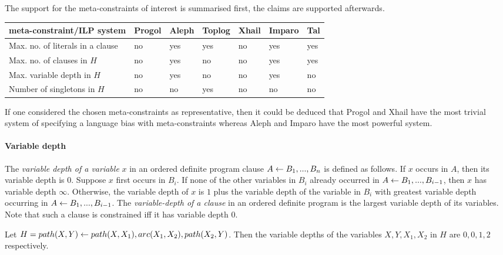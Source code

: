 The support for the meta-constraints of interest is summarised first, the claims are supported afterwards.

\begin{center}
 \label{tab:classification_by_meta-constraints} 
 \begin{tabular}{| l | l | l | l | l | l | l |}
    \hline
    meta-constraint/ILP system & Progol & Aleph & Toplog & Xhail & Imparo & Tal \\ \hline
    Max. no. of literals in a clause & no & yes & yes & no & yes & yes\\ \hline
    Max. no. of clauses in $H$ & no & yes & no & no & yes & yes\\ \hline
    Max. variable depth in $H$ & no & yes & no & no & yes & no\\ \hline
    Number of singletons in $H$ & no & no & yes & no & no & no\\ \hline
  \end{tabular}
  \end{center}
  
If one considered the chosen meta-constraints as representative, then it could be deduced that Progol and Xhail have the most trivial system of specifying a language bias with meta-constraints whereas Aleph and Imparo have the most powerful system.

\paragraph{Variable depth}
\begin{defn}\label{definition_variable_depth}\cite{nienhuys1997foundations}
The \emph{variable depth of a variable} $x$ in an ordered definite program clause
$A \leftarrow  B_1, . . . , B_n$ is defined as follows. If $x$ occurs in $A$, then its variable depth is $0$. Suppose $x$ first occurs in $B_i$.
If none of the other variables
in $B_i$ already occurred in $A \leftarrow B_1,... ,B_{i-1}$,
then $x$ has variable depth $\infty$.
Otherwise, the variable depth of $x$ is $1$ plus the variable depth of the variable in $B_i$ with greatest variable depth occurring in
$A \leftarrow B_1,... ,B_{i-1}$.
The \emph{variable-depth of a clause} in an ordered definite program
is the largest variable depth of its variables. Note that such a
clause is constrained iff it has variable depth $0$.
\end{defn}

\begin{exmp}
Let $H=path(X,Y) \leftarrow path(X,X_1), arc(X_1,X_2), path(X_2,Y)$.
Then the variable depths of the variables $X,Y,X_1,X_2$ in $H$ are
$0,0,1,2$ respectively.
\end{exmp}


